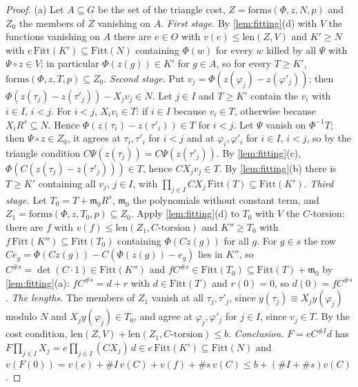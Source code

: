 \begin{proof}
(a) Let $A\subseteq G$ be the set of the triangle cost, $Z=\mathrm{forms}(\Phi,z,N,p)$ and $Z_0$ the members of $Z$ vanishing on $A$. \emph{First stage.} By \cref{lem:fitting}(d) with $V$ the functions vanishing on $A$ there are $e\in O$ with
$v(e)\le\mathrm{len}(Z,V)$ and $K'\ge N$ with $e\,\mathrm{Fitt}(K')\subseteq\mathrm{Fitt}(N)$ containing $\Phi(w)$ for every $w$ killed by all $\Psi$ with $\Psi\circ z\in V$; in particular $\Phi(z(g))\in K'$ for $g\in A$, so for every $T\ge K'$,
$\mathrm{forms}(\Phi,z,T,p)\subseteq Z_0$. \emph{Second stage.} Put $v_j=\Phi(z(\varphi_j)-z(\varphi'_j))$; then $\Phi(z(\tau_j)-z(\tau'_j))-X_jv_j\in N$. Let $j\in I$ and $T\ge K'$ contain the $v_i$ with $i\in I$, $i<j$. For $i<j$, $X_iv_i\in T$: if $i\in I$ because
$v_i\in T$, otherwise because $X_iR^s\subseteq N$. Hence $\Phi(z(\tau_i)-z(\tau'_i))\in T$ for $i<j$. Let $\Psi$ vanish on $\Phi^{-1}T$; then $\Psi\circ z\in Z_0$, it agrees at $\tau_i,\tau'_i$ for $i<j$ and at $\varphi_i,\varphi'_i$ for $i\in I$, $i<j$, so by the
triangle condition $C\Psi(z(\tau_j))=C\Psi(z(\tau'_j))$. By \cref{lem:fitting}(c), $\Phi(C(z(\tau_j)-z(\tau'_j)))\in T$, hence $CX_jv_j\in T$. By \cref{lem:fitting}(b) there is $T\ge K'$ containing all $v_j$, $j\in I$, with
$\prod_{j\in I}CX_j\,\mathrm{Fitt}(T)\subseteq\mathrm{Fitt}(K')$. \emph{Third stage.} Let $T_0=T+\mathfrak m_0R^s$, $\mathfrak m_0$ the polynomials without constant term, and $Z_1=\mathrm{forms}(\Phi,z,T_0,p)\subseteq Z_0$. Apply \cref{lem:fitting}(d) to $T_0$ with $V$ the
$C$-torsion: there are $f$ with $v(f)\le\mathrm{len}(Z_1,C\text{-torsion})$ and $K''\ge T_0$ with $f\,\mathrm{Fitt}(K'')\subseteq\mathrm{Fitt}(T_0)$ containing $\Phi(Cz(g))$ for all $g$. For $g\in s$ the row $Ce_g=\Phi(Cz(g))-C(\Phi(z(g))-e_g)$ lies in
$K''$, so $C^{\#s}=\det(C\cdot1)\in\mathrm{Fitt}(K'')$ and $fC^{\#s}\in\mathrm{Fitt}(T_0)\subseteq\mathrm{Fitt}(T)+\mathfrak m_0$ by \cref{lem:fitting}(a): $fC^{\#s}=d+r$ with $d\in\mathrm{Fitt}(T)$ and $r(0)=0$, so $d(0)=fC^{\#s}$. \emph{The lengths.} The members of $Z_1$ vanish
at all $\tau_j,\tau'_j$, since $y(\tau_j)\equiv X_jy(\varphi_j)$ modulo $N$ and $X_jy(\varphi_j)\in T_0$, and agree at $\varphi_j,\varphi'_j$ for $j\in I$, since $v_j\in T$. By the cost condition, $\mathrm{len}(Z,V)+\mathrm{len}(Z_1,C\text{-torsion})\le b$.
\emph{Conclusion.} $F=eC^{\#I}d$ has $F\prod_{j\in I}X_j=e\prod_{j\in I}(CX_j)\,d\in e\,\mathrm{Fitt}(K')\subseteq\mathrm{Fitt}(N)$ and $v(F(0))=v(e)+\#I\,v(C)+v(f)+\#s\,v(C)\le b+(\#I+\#s)v(C)$.


\end{proof}
